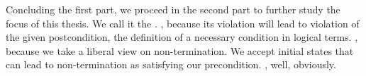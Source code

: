Concluding the first part, we proceed in the second part to further study the focus of this thesis. 
We call it the . 
, because its violation will lead to violation of the given postcondition, the definition of a necessary condition in logical terms. 
, because we take a liberal view on non-termination. We accept initial states that can lead to non-termination as satisfying our precondition. 
, well, obviously. 


